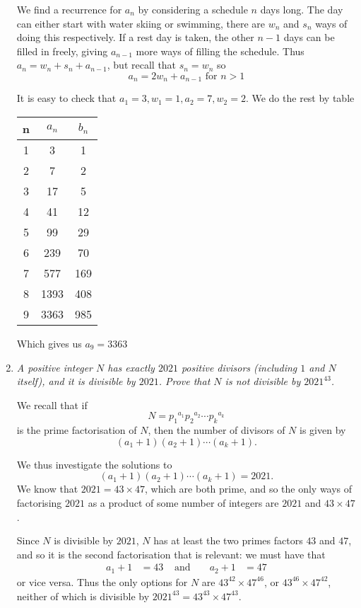 \documentclass{article}
\begin{document}
\begin{enumerate}[1.]
We find a recurrence for $a_n$ by considering a schedule $n$ days long. The day can either start with water skiing or swimming, there are $w_n$ and $s_n$ ways of doing this respectively. If a rest day is taken, the other $n - 1$ days can be filled in freely, giving $a_{n - 1}$ more ways of filling the schedule. Thus $a_n = w_n + s_n + a_{n - 1}$, but recall that $s_n = w_n$ so $$a_n = 2w_n + a_{n - 1} \text{ for } n > 1$$

It is easy to check that $a_1 = 3, w_1 = 1, a_2 = 7, w_2 = 2$. We do the rest by table
\begin{table}[h]
	\centering
	\begin{tabular}{c | c | c}
	n& $a_n$ & $b_n$\\
	\hline
1 & 3 & 1 \\
2 & 7 & 2 \\
3 & 17 & 5 \\
4 & 41 & 12 \\
5 & 99 & 29 \\
6 & 239 & 70 \\
7 & 577 & 169 \\
8 & 1393 & 408 \\
9 & 3363 & 985 \\
	\toprule
	\end{tabular}
\end{table}

Which gives us $a_9 = 3363$
  
  
  \item %
  {\itshape A positive integer $N$ has exactly $2021$ positive divisors (including $1$ and $N$ itself), and it is divisible by $2021$.
  Prove that $N$ is not divisible by $2021^{43}$.}

  We recall that if
  \[
    N = {p_1}^{a_1} {p_2}^{a_2} \cdots {p_k}^{a_k}
  \]
  is the prime factorisation of $N$, then the number of divisors of $N$ is given by
  \[
    (a_1 + 1)(a_2 + 1) \cdots (a_k + 1).
  \]

  We thus investigate the solutions to
  \[
    (a_1 + 1)(a_2 + 1) \cdots (a_k + 1) = 2021.
  \]
  We know that $2021 = 43 \times 47$, which are both prime, and so the only ways of factorising $2021$ as a product of some number of integers are $2021$ and $43 \times 47$.

  Since $N$ is divisible by $2021$, $N$ has at least the two primes factors $43$ and $47$, and so it is the second factorisation that is relevant: we must have that
  \begin{align*}
    a_1 + 1 & = 43 & \text{ and } && a_2 + 1 & = 47
  \end{align*}
  or vice versa. Thus the only options for $N$ are $43^{42} \times 47^{46}$, or $43^{46} \times 47^{42}$, neither of which is divisible by $2021^{43} = 43^{43} \times 47^{43}$.
    

\end{enumerate}
\end{document}
